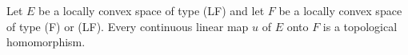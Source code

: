 Let $E$ be a locally convex space of type (LF) and let $F$ be a locally convex space of type (F) or (LF).
Every continuous linear map $u$ of $E$ onto $F$ is a topological homomorphism.
